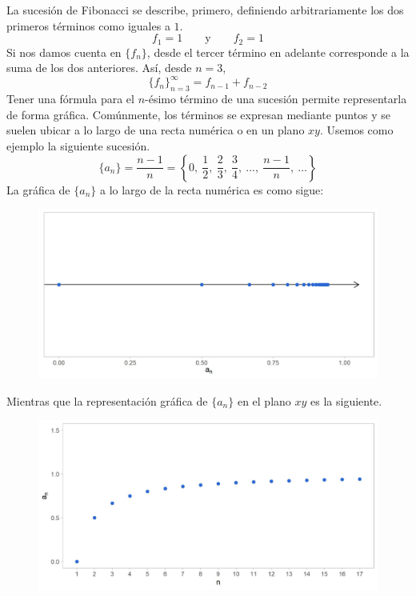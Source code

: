 \documentclass[12pt]{article}
\begin{document}
La sucesión de Fibonacci se describe, primero, definiendo arbitrariamente los dos primeros términos como iguales a $1$.
\[
  f_{1} = 1 \qquad \text{y} \qquad f_{2} = 1
\]
Si nos damos cuenta en $\{f_{n}\}$, desde el tercer término en adelante corresponde a la suma de los dos anteriores. Así, desde $n = 3$,
\[
  \{f_{n}\}_{n = 3}^{\infty} = f_{n - 1} + f_{n - 2}
\]
Tener una fórmula para el $n$-ésimo término de una sucesión permite representarla de forma gráfica. Comúnmente, los términos se expresan mediante puntos y se suelen ubicar a lo largo de una recta numérica o en un plano $xy$. Usemos como ejemplo la siguiente sucesión.
\[
  \{a_{n}\} = \frac{n - 1}{n}
            = \left\{0, \ \frac{1}{2}, \ \frac{2}{3}, \ \frac{3}{4}, \ \ldots, \ \frac{n - 1}{n}, \ \ldots \right\}
\]
La gráfica de $\{a_{n}\}$ a lo largo de la recta numérica es como sigue:

\begin{figure}[hbt!]
\centering
\includegraphics[scale=0.7]{rect-line-plot.jpg}
\end{figure}

\newpage

Mientras que la representación gráfica de $\{a_{n}\}$ en el plano $xy$ es la siguiente.

\begin{figure}[hbt!]
\centering
\includegraphics[scale=0.7]{xy-plane-plot.jpg}
\end{figure}
\end{document}
